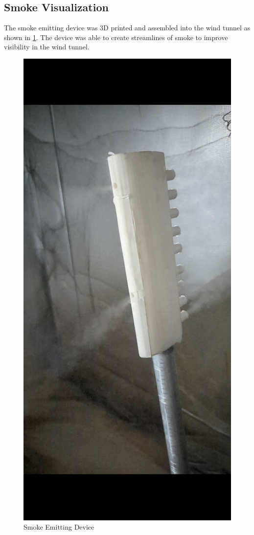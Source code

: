 \subsection{Smoke Visualization}
The smoke emitting device was 3D printed and assembled into the wind tunnel as shown in \ref{fig:smoke_res}. 
The device was able to create streamlines of smoke to improve visibility in the wind tunnel.
\begin{center}
	\begin{figure}
		\centering
		\includegraphics[width=0.5\linewidth]{Figures/Screenshot_20221211-185935.png}
		\caption[Smoke Emitting Device]{Smoke Emitting Device}
		\label{fig:smoke_res}
	\end{figure}
\end{center}

